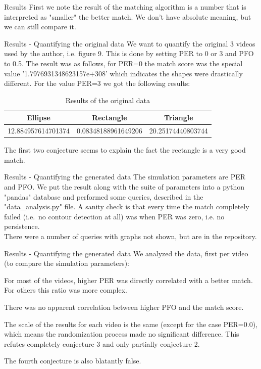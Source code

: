 \documentclass[]{beamer}
\theoremstyle{remark}
\begin{document}
\begin{frame}{Results}
First we note the result of the matching algorithm is a number that is interpreted as "smaller" the better match. We don't have absolute meaning, but we can still compare it.

\end{frame}

\begin{frame}{Results - Quantifying the original data}
We want to quantify the original 3 videos used by the author, i.e. figure 9. This is done by setting PER to 0 or 3 and PFO to 0.5. The result was as follows, for PER=0 the match score was the special value '1.7976931348623157e+308' which indicates the shapes were drastically different. For the value PER=3 we got the following results:
\begin{table}[h!]
	\centering
	\begin{tabular}{|c|c|c|}
		\hline
		Ellipse & Rectangle & Triangle \\
		\hline
		12.884957614701374 & 0.08348188961649206 & 20.25174440803744  \\
		\hline
	\end{tabular}
	\caption{Results of the original data}
	\label{fig:original_results}
\end{table}

The first two conjecture seems to explain the fact the rectangle is a very good match.
\end{frame}

\begin{frame}{Results - Quantifying the generated data}
The simulation parameters are PER and PFO.
We put the result along with the suite of parameters into a python "pandas" database and performed some queries, described in the "data\_analysis.py" file. A sanity check is that every time the match completely failed (i.e.\ no contour detection at all) was when PER was zero, i.e. no persistence. \\
There were a number of queries with graphs not shown, but are in the repository.

\end{frame}
\begin{frame}{Results - Quantifying the generated data}
We analyzed the data, first per video (to compare the simulation parameters):

For most of the videos, higher PER was directly correlated with a better match. For others this ratio was more complex.

There was no apparent correlation between higher PFO and the match score.

The scale of the results for each video is the same (except for the case PER=0.0), which means the randomization process made no significant difference. This refutes completely conjecture 3 and only partially conjecture 2.

The fourth conjecture is also blatantly false.
\end{frame}
\end{document}
